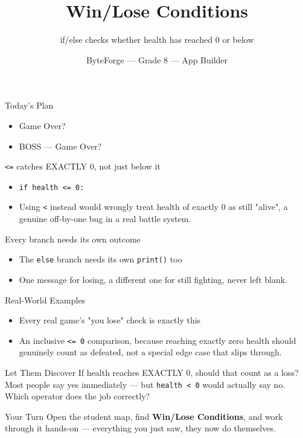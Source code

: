 \documentclass[aspectratio=169]{beamer}
\title{Win/Lose Conditions}
\subtitle{if/else checks whether health has reached 0 or below}
\author{ByteForge --- Grade 8 --- App Builder}
\date{}
\begin{document}
\begin{frame}
    \titlepage
\end{frame}

\begin{frame}{Today's Plan}
    \begin{itemize}
        \item Game Over?
        \item[$\bigstar$] BOSS --- Game Over?
    \end{itemize}
\end{frame}

\begin{frame}{\texttt{<=} catches EXACTLY 0, not just below it}
    \large
    \begin{itemize}
        \item \texttt{if health <= 0:}
        \item Using \texttt{<} instead would wrongly treat health of exactly 0 as still "alive", a genuine off-by-one bug in a real battle system.
    \end{itemize}
\end{frame}


\begin{frame}{Every branch needs its own outcome}
    \large
    \begin{itemize}
        \item The \texttt{else} branch needs its own \texttt{print()} too
        \item One message for losing, a different one for still fighting, never left blank.
    \end{itemize}
\end{frame}

\begin{frame}{Real-World Examples}
    \large
    \begin{itemize}
        \item Every real game's "you lose" check is exactly this
        \item An inclusive \texttt{<= 0} comparison, because reaching exactly zero health should genuinely count as defeated, not a special edge case that slips through.
    \end{itemize}
\end{frame}


\begin{frame}{Let Them Discover}
    \Large
    If health reaches EXACTLY 0, should that count as a loss? Most people say yes immediately — but \texttt{health < 0} would actually say no. Which operator does the job correctly?
\end{frame}

\begin{frame}{Your Turn}
    \Large
    Open the student map, find \textbf{Win/Lose Conditions}, and work through it
    hands-on --- everything you just saw, they now do themselves.
\end{frame}
\end{document}
